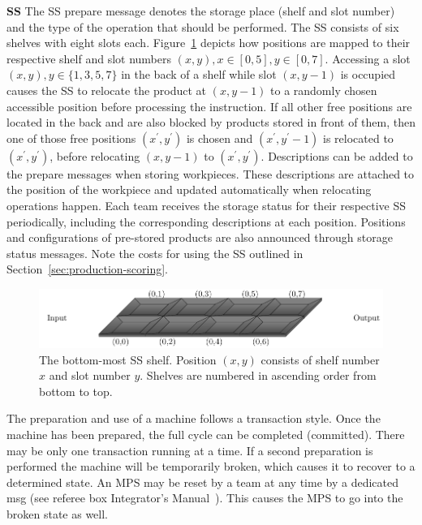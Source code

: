 \documentclass[12pt,twoside]{article}
\newcommand{\refsec}[1]{Section~\ref{#1}}
\newcommand{\reffig}[1]{Figure~\ref{#1}}
\begin{document}
\noindent\textbf{SS}
The SS prepare message denotes the storage place (shelf and slot number) and
the type of the operation that should be performed.
The SS consists of six shelves with eight slots each. \reffig{fig:ss-shelf}
depicts how positions are mapped to their respective shelf and slot numbers
$(x,y),x\in[0,5],y\in[0,7]$.
Accessing a slot $(x,y), y\in\{1,3,5,7\}$ in the back of a shelf while slot
$(x,y-1)$ is occupied causes the SS to relocate the product at $(x,y-1)$ to a
randomly chosen accessible position before processing the instruction.
If all other free positions are located in the back and
are also blocked by products stored in front of them, then one of those free
positions $(x^\prime,y^\prime)$ is chosen and
$(x^\prime,y^\prime-1)$ is relocated to $(x^\prime,y^\prime)$, before
relocating $(x,y-1)$ to $(x^\prime,y^\prime)$.
Descriptions can be added to the prepare messages when storing workpieces.
These descriptions are attached to the position of the workpiece and updated
automatically when relocating operations happen.
Each team receives the storage status for their respective SS
periodically, including the corresponding descriptions at each position.
Positions and configurations of pre-stored products are also announced through
storage status messages.
Note the costs for using the SS outlined in \refsec{sec:production-scoring}.


\begin{figure}[ht]
  \centering
    \includegraphics{figures/storage-shelf.pdf}
    \caption{The bottom-most SS shelf. Position $(x,y)$ consists of
      shelf number $x$ and slot number $y$.
    Shelves are numbered in ascending order from bottom to top.}
    \label{fig:ss-shelf}
\end{figure}

\medskip
The preparation and use of a machine follows a transaction style. Once the
machine has been prepared, the full cycle can be completed (committed).
There may be only one transaction running at a time. If a
second preparation is performed the machine will
be temporarily broken, which causes it to recover to a determined state.
An MPS may be reset by a team at any time by a dedicated msg (see
referee box Integrator's Manual~\cite{RefBoxIntManual}). This causes
the MPS to go into the broken state as well.
\end{document}
